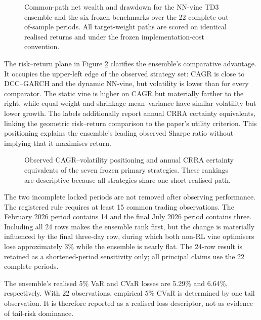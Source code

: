 \begin{figure}[tbp]
\centering

\caption{Common-path net wealth and drawdown for the NN-vine TD3 ensemble and the six frozen benchmarks over the 22 complete out-of-sample periods. All target-weight paths are scored on identical realised returns and under the frozen implementation-cost convention.}
\label{fig:oos-wealth-drawdown}
\end{figure}

The risk--return plane in Figure \ref{fig:primary_risk_return} clarifies the ensemble's comparative advantage. It occupies the upper-left edge of the observed strategy set: CAGR is close to DCC--GARCH and the dynamic NN-vine, but volatility is lower than for every comparator. The static vine is higher on CAGR but materially farther to the right, while equal weight and shrinkage mean--variance have similar volatility but lower growth. The labels additionally report annual CRRA certainty equivalents, linking the geometric risk--return comparison to the paper's utility criterion. This positioning explains the ensemble's leading observed Sharpe ratio without implying that it maximises return.

\begin{figure}[htbp]
\centering

\caption{Observed CAGR--volatility positioning and annual CRRA certainty equivalents of the seven frozen primary strategies. These rankings are descriptive because all strategies share one short realised path.}
\label{fig:primary_risk_return}
\end{figure}

The two incomplete locked periods are not removed after observing performance. The registered rule requires at least 15 common trading observations. The February 2026 period contains 14 and the final July 2026 period contains three. Including all 24 rows makes the ensemble rank first, but the change is materially influenced by the final three-day row, during which both non-RL vine optimisers lose approximately 3\% while the ensemble is nearly flat. The 24-row result is retained as a shortened-period sensitivity only; all principal claims use the 22 complete periods.

The ensemble's realised 5\% VaR and CVaR losses are 5.29\% and 6.64\%, respectively. With 22 observations, empirical 5\% CVaR is determined by one tail observation. It is therefore reported as a realised loss descriptor, not as evidence of tail-risk dominance.

